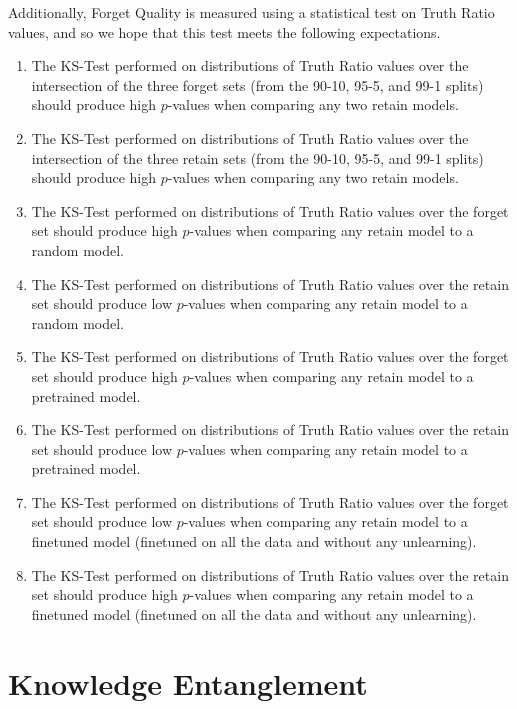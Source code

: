 Additionally, Forget Quality is measured using a statistical test on Truth Ratio values, and so we hope that this test meets the following expectations.
\begin{enumerate}
    \item The KS-Test performed on distributions of Truth Ratio values over the intersection of the three forget sets (from the 90-10, 95-5, and 99-1 splits) should produce high $p$-values when comparing any two retain models.
    \item The KS-Test performed on distributions of Truth Ratio values over the intersection of the three retain sets (from the 90-10, 95-5, and 99-1 splits) should produce high $p$-values when comparing any two retain models.
    \item The KS-Test performed on distributions of Truth Ratio values over the forget set should produce high $p$-values when comparing any retain model to a random model.
    \item The KS-Test performed on distributions of Truth Ratio values over the retain set should produce low $p$-values when comparing any retain model to a random model.
    \item The KS-Test performed on distributions of Truth Ratio values over the forget set should produce high $p$-values when comparing any retain model to a pretrained model.
    \item The KS-Test performed on distributions of Truth Ratio values over the retain set should produce low $p$-values when comparing any retain model to a pretrained model.
    \item The KS-Test performed on distributions of Truth Ratio values over the forget set should produce low $p$-values when comparing any retain model to a finetuned model (finetuned on all the \tofu{} data and without any unlearning).
    \item The KS-Test performed on distributions of Truth Ratio values over the retain set should produce high $p$-values when comparing any retain model to a finetuned model (finetuned on all the \tofu{} data and without any unlearning).
\end{enumerate}

\section{Knowledge Entanglement}
\label{sec:app-knowledge-entanglement}

